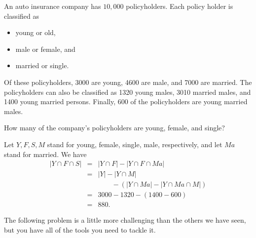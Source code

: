 \begin{exa}
An auto insurance company has $10,000$ policyholders. Each policy
holder is classified as
\begin{center} 
\begin{itemize}
\item young or old, 
\item male or female, and 
\item married or single. 
\end{itemize}
\end{center}
Of these policyholders, 3000 are young, 4600 are male, and 7000 are
married. The policyholders can also be classified as 1320 young
males, 3010 married males, and 1400 young married persons. Finally,
600 of the policyholders are young married males.

How many of the company's policyholders are young, female, and
single? 
\begin{sol}
Let $Y, F, S, M$ stand for young, female,
single, male, respectively, and let $Ma$ stand for married. We have
$$\begin{array}{lll}|Y\cap F \cap S| & = & |Y\cap F| - |Y\cap F \cap Ma| \\
& =  &|Y| - |Y\cap M|  \\
& & \qquad - (|Y\cap Ma|  - |Y\cap Ma \cap M|) \\
& = & 3000 - 1320 - (1400 - 600) \\
& = & 880.
\end{array}
$$
\end{sol}
\end{exa}

The following problem is a little more challenging than the others we have seen, but
you have all of the tools you need to tackle it.


